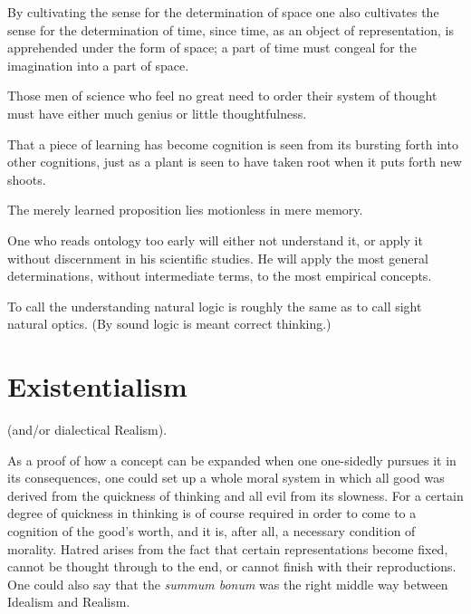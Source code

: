 \documentclass[12pt,a4paper]{article}
\newcommand{\aphsep}{\par\smallskip\centerline{\textasteriskcentered}\smallskip}
\begin{document}
\aphsep

By cultivating the sense for the determination of space one also cultivates the
sense for the determination of time, since time, as an object of representation,
is apprehended under the form of space; a part of time must congeal for the
imagination into a part of space.

\aphsep

Those men of science who feel no great need to order their system of thought must
have either much genius or little thoughtfulness.

\aphsep

That a piece of learning has become cognition is seen from its bursting forth
into other cognitions, just as a plant is seen to have taken root when it puts
forth new shoots.

\aphsep

The merely learned proposition lies motionless in mere memory.

\aphsep

One who reads ontology too early will either not understand it, or apply it
without discernment in his scientific studies. He will apply the most general
determinations, without intermediate terms, to the most empirical concepts.

\aphsep

To call the understanding natural logic is roughly the same as to call sight
natural optics. (By sound logic is meant correct thinking.)

\bigskip

\section*{Existentialism}
\label{ch:004}

\begin{center}(and/or dialectical Realism).\end{center}

\aphsep

As a proof of how a concept can be expanded when one one-sidedly pursues it in
its consequences, one could set up a whole moral system in which all good was
derived from the quickness of thinking and all evil from its slowness. For a
certain degree of quickness in thinking is of course required in order to come to
a cognition of the good's worth, and it is, after all, a necessary condition of
morality. Hatred arises from the fact that certain representations become fixed,
cannot be thought through to the end, or cannot finish with their reproductions.
One could also say that the \textit{summum bonum} was the right middle way
between Idealism and Realism.
\end{document}
